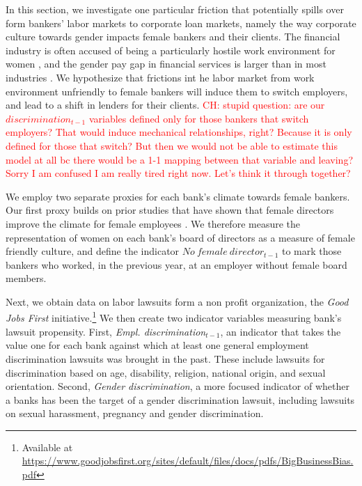 In this section, we investigate one particular friction that potentially spills over form bankers' labor markets to corporate loan markets, namely the way corporate culture towards gender impacts female bankers and their clients. The financial industry is often accused of being a particularly hostile work environment for women \citep{Jaekel.2016}, 
and the gender pay gap in financial services is larger than in most industries \citep{BLS2019}. %
We hypothesize that frictions int he labor market from work environment unfriendly to female bankers will induce them to switch employers, and lead to a shift in lenders for their clients. %
\textcolor{red}{CH: stupid question: are our $discrimination_{t-1}$ variables defined only for those bankers that switch employers? That would induce mechanical relationships, right? Because it is only defined for those that switch? But then we would not be able to estimate this model at all bc there would be a 1-1 mapping between that variable and leaving? Sorry I am confused I am really tired right now. Let's think it through together?	}

We employ two separate proxies for each bank's climate towards female bankers. Our first proxy builds on prior studies that have shown that female directors improve the climate for female employees \citep{Bilimoria2006}. We therefore measure the representation of women on each bank's board of directors as a measure of female friendly culture, and define the indicator $No~female~director_{t-1}$ to mark those bankers who worked, in the previous year, at an employer without female board members.

Next, we obtain data on labor lawsuits form a non profit organization, the \emph{Good Jobs First} initiative.\footnote{Available at \url{https://www.goodjobsfirst.org/sites/default/files/docs/pdfs/BigBusinessBias.pdf}} 
We then create two indicator variables measuring bank's lawsuit propensity. First, \emph{Empl. discrimination$_{t-1}$}, an indicator that takes the value one for each bank against which at least one general employment discrimination lawsuits was brought in the past. These include lawsuits for discrimination based on age, disability, religion, national origin, and sexual orientation. Second, \emph{Gender discrimination}, a more focused indicator of whether a banks has been the target of a gender discrimination lawsuit, including lawsuits on sexual harassment, pregnancy and gender discrimination. 


